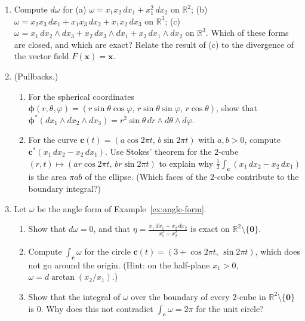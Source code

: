 \documentclass[11pt]{article}
\theoremstyle{definition}
\theoremstyle{plain}
\theoremstyle{remark}
\begin{document}
\begin{enumerate}[leftmargin=*]
\begin{enumerate}[label=(\alph*)]
        \item Write down a basis of $\Lambda^2(\mathbb{R}^4)^*$.
        \item Show that $\varphi \wedge \varphi = 0$ for every $1$-form $\varphi$, but that $\omega = dx_1 \wedge dx_2 + dx_3 \wedge dx_4$ satisfies $\omega \wedge \omega = 2\, dx_1 \wedge dx_2 \wedge dx_3 \wedge dx_4 \neq 0$.
    \end{enumerate}
    \item Compute $d\omega$ for (a) $\omega = x_1x_2\, dx_1 + x_1^2\, dx_2$ on $\mathbb{R}^2$; (b) $\omega = x_2x_3\, dx_1 + x_1x_3\, dx_2 + x_1x_2\, dx_3$ on $\mathbb{R}^3$; (c) $\omega = x_1\, dx_2 \wedge dx_3 + x_2\, dx_3 \wedge dx_1 + x_3\, dx_1 \wedge dx_2$ on $\mathbb{R}^3$. Which of these forms are closed, and which are exact? Relate the result of (c) to the divergence of the vector field $F(\mathbf{x}) = \mathbf{x}$.
    \item (Pullbacks.)
    \begin{enumerate}[label=(\alph*)]
        \item For the spherical coordinates $\boldsymbol{\phi}(r, \theta, \varphi) = (r\sin\theta\cos\varphi, \, r\sin\theta\sin\varphi, \, r\cos\theta)$, show that $\boldsymbol{\phi}^*(dx_1 \wedge dx_2 \wedge dx_3) = r^2\sin\theta\, dr \wedge d\theta \wedge d\varphi$.
        \item For the curve $\mathbf{c}(t) = (a\cos 2\pi t, \, b\sin 2\pi t)$ with $a, b > 0$, compute $\mathbf{c}^*(x_1\, dx_2 - x_2\, dx_1)$. Use Stokes' theorem for the $2$-cube $(r, t) \mapsto (ar\cos 2\pi t, \, br\sin 2\pi t)$ to explain why $\frac{1}{2}\int_{\mathbf{c}} (x_1\, dx_2 - x_2\, dx_1)$ is the area $\pi ab$ of the ellipse. (Which faces of the $2$-cube contribute to the boundary integral?)
    \end{enumerate}
    \item Let $\omega$ be the angle form of Example~\ref{ex:angle-form}.
    \begin{enumerate}[label=(\alph*)]
        \item Show that $d\omega = 0$, and that $\eta = \frac{x_1\, dx_1 + x_2\, dx_2}{x_1^2 + x_2^2}$ is exact on $\mathbb{R}^2 \setminus \{\mathbf{0}\}$.
        \item Compute $\int_{\mathbf{c}} \omega$ for the circle $\mathbf{c}(t) = (3 + \cos 2\pi t, \, \sin 2\pi t)$, which does not go around the origin. (Hint: on the half-plane $x_1 > 0$, $\omega = d\arctan(x_2/x_1)$.)
        \item Show that the integral of $\omega$ over the boundary of every $2$-cube in $\mathbb{R}^2 \setminus \{\mathbf{0}\}$ is $0$. Why does this not contradict $\int_{\mathbf{c}} \omega = 2\pi$ for the unit circle?

\end{enumerate}
\end{enumerate}
\end{document}
